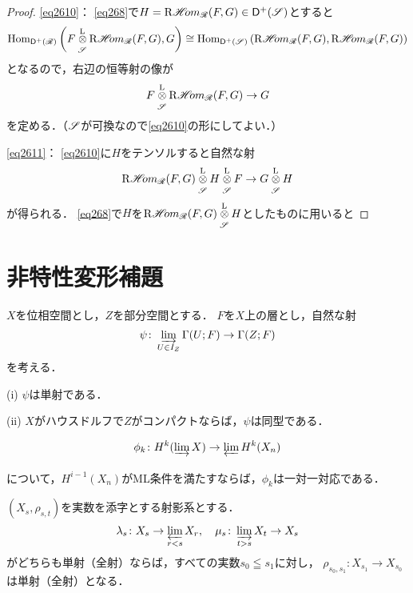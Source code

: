 \begin{proof}
    \eqref{eq2610}：
    \eqref{eq268}で\(
        H=\RHOM_{\scR}(F,G)\in\Dompl(\scS)
    \)とすると
    \[
        \Hom_{\Dompl(\scR)}\left(
            F\lltens[\scS]\RHOM_{\scR}(F,G),G
        \right)
        \cong
        \Hom_{\Dompl(\scS)}\left(
            \RHOM_{\scR}(F,G),\RHOM_{\scR}(F,G)
        \right)
    \]
    となるので，右辺の恒等射の像が
    \[
        F\lltens[\scS]\RHOM_{\scR}(F,G)\to G
    \]
    を定める．（\(\scS\)が可換なので\eqref{eq2610}の形にしてよい．）

    \eqref{eq2611}：
    \eqref{eq2610}に\(H\)をテンソルすると自然な射
    \[
        \RHOM_{\scR}(F,G)\lltens[\scS]H\lltens[\scS]F
        \to 
        G\lltens[\scS]H
    \]
    が得られる．
    \eqref{eq268}で\(H\)を\(
        \RHOM_{\scR}(F,G)\lltens[\scS]H
    \)としたものに用いると
\end{proof}













\clearpage
\section{非特性変形補題}
\begin{leftbar}
\begin{PRP}[{\cite[Prop. 2.5.1]{KS90}}]\label{PRP2.5.1}
    \(X\)を位相空間とし，\(Z\)を部分空間とする．
    \(F\)を\(X\)上の層とし，自然な射
    \[
        \psi\colon\indlim[U\in I_Z]\Gamma(U;F)\to\Gamma(Z;F)
    \]を考える．

    (i) 
    \(\psi\)は単射である．

    (ii)
    \(X\)がハウスドルフで\(Z\)がコンパクトならば，\(\psi\)は同型である．
\end{PRP}
\end{leftbar}
\begin{leftbar}
    \begin{PRP}[{\cite[Prop. 1.12.4]{KS90}}]\label{PRP1.12.4}
        \[
            \phi_k\colon H^k(\indlim X)\to\prolim H^k(X_n)
        \]
        について，\(H^{i-1}(X_n)\)がML条件を満たすならば，\(\phi_k\)は一対一対応である．
    \end{PRP}
\end{leftbar}
    
\begin{leftbar}
\begin{PRP}[{\cite[Prop. 1.12.6]{KS90}}]\label{PRP1.12.6}
    \((X_s,\rho_{s,t})\)を実数を添字とする射影系とする．
    \[
        \lambda_s\colon X_s\to\prolim[r<s]X_r,
        \quad
        \mu_s\colon\indlim[t>s]X_t\to X_s
    \]
    がどちらも単射（全射）ならば，すべての実数\(s_0\leqq s_1\)に対し，
    \(\rho_{s_0,s_1}\colon X_{s_1}\to X_{s_0}\)は単射（全射）となる．
\end{PRP}
\end{leftbar}

